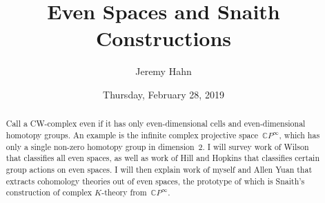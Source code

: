 \documentclass{UAmathtalk}
\author{Jeremy Hahn}
\title{Even Spaces and Snaith Constructions}
\date{Thursday, February 28, 2019}
\begin{document}
\maketitle

\begin{abstract}
Call a CW-complex even if it has only even-dimensional cells and even-dimensional homotopy groups.  An example is the infinite complex projective space~$\mathbb{C}P^\infty$, which has only a single non-zero homotopy group in dimension~$2$.  I will survey work of Wilson that classifies all even spaces, as well as work of Hill and Hopkins that classifies certain group actions on even spaces.  I will then explain work of myself and Allen Yuan that extracts cohomology theories out of even spaces, the prototype of which is Snaith's construction of complex $K$-theory from~$\mathbb{C}P^\infty$.
\end{abstract}
\end{document}
